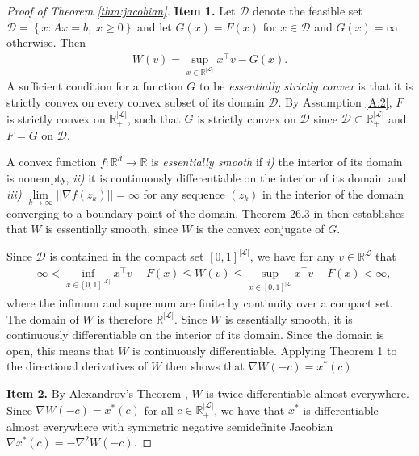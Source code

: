 \documentclass[a4paper,11pt]{article}
\newcommand{\R}{\mathbb{R}}
\begin{document}
\begin{proof}[Proof of Theorem \ref{thm:jacobian}]
 \textbf{Item 1.}   Let $\mathcal{D}$ denote the feasible set $\mathcal{D}=\left\{x: Ax=b,\; x\geq 0\right\}$ and let $G(x)=F(x)$ for $x\in \mathcal{D}$ and $G(x)=\infty$ otherwise. Then
    \begin{eqnarray}
        W(v)=\sup_{x\in \mathbb R^{|\mathcal{L}|}}x^\top v-G(x).
    \end{eqnarray}
A sufficient condition for a function $G$ to be \textit{essentially strictly convex} \citep{rockafellar_convex_1970} is that it is strictly convex on every convex subset of its domain $\mathcal{D}$. By Assumption \ref{A:2}, $F$ is strictly convex on $\R^{|\mathcal{L}|}_+$, such that $G$ is strictly convex on $\mathcal{D}$ since $\mathcal{D}\subset \R^{|\mathcal{L}|}_+$ and $F=G$ on $\mathcal{D}$. 

A convex function $f:\R^d\rightarrow \R$ is \textit{essentially smooth} \citep{rockafellar_convex_1970} if \textit{i)} the interior of its domain is nonempty, \textit{ii)} it is continuously differentiable on the interior of its domain and \textit{iii)} $\underset{k\rightarrow \infty}{\lim} ||\nabla f(z_k)||=\infty$ for any sequence $(z_k)$ in the interior of the domain converging to a boundary point of the domain. Theorem 26.3 in \citet{rockafellar_convex_1970} then establishes that $W$ is essentially smooth, since $W$ is the convex conjugate of $G$.  

Since $\mathcal{D}$ is contained in the compact set $[0,1]^{|\mathcal{L}|}$, we have for any $v\in \R^{\mathcal{L}}$ that
\begin{eqnarray*}
 -\infty< \inf_{x\in [0,1]^{|\mathcal{L}|}}x^\top v-F(x)\leq  W(v)\leq \sup_{x\in [0,1]^{|\mathcal{L}}}x^\top v-F(x)<\infty,
\end{eqnarray*}
where the infimum and supremum are finite by continuity over a compact set. The domain of $W$ is therefore $\R^{|\mathcal{L}|}$. Since $W$ is essentially smooth, it is continuously differentiable on the interior of its domain. Since the domain is open, this means that $W$ is continuously differentiable. Applying \citet{milgrom_envelope_2002} Theorem 1 to the directional derivatives of $W$ then shows that $\nabla W(-c)=x^*(c)$.

\textbf{Item 2.} By Alexandrov's Theorem \citep{Alexandroff1939}, $W$ is twice differentiable almost everywhere. Since $\nabla W(-c)=x^*(c)$ for all $c\in \R^{|\mathcal{L}|}_+$, we have that $x^*$ is differentiable almost everywhere with symmetric negative semidefinite Jacobian $\nabla x^*(c)=-\nabla^2 W(-c)$.


\end{proof}
\end{document}

